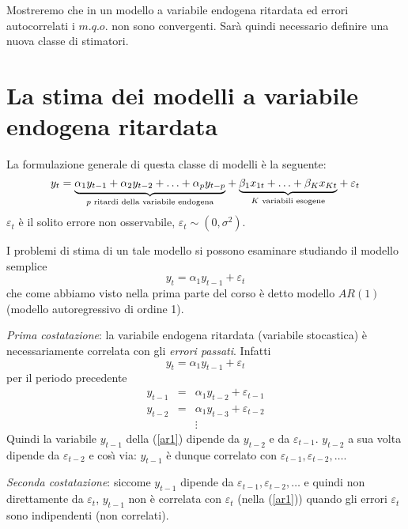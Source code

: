 \documentclass[a4paper]{report}
\newcounter{def}
\theoremstyle{remark}
\begin{document}
\noindent Mostreremo che in un modello a variabile endogena ritardata ed
errori autocorrelati i $m.q.o.$ non sono convergenti. Sar\`{a} quindi
necessario definire una nuova classe di stimatori.

\section{La stima dei modelli a variabile endogena ritardata}

La formulazione generale di questa classe di modelli \`{e} la seguente:%
\begin{equation*}
y_{t}=\underset{p\text{ ritardi della variabile endogena}}{\underbrace{%
\alpha _{1}y_{t-1}+\alpha _{2}y_{t-2}+\ldots +\alpha _{p}y_{t-p}}}+\underset{%
K\text{ variabili esogene}}{\underbrace{\beta _{1}x_{1t}+\ldots +\beta
_{K}x_{Kt}}}+\varepsilon _{t}
\end{equation*}%
$\varepsilon _{t}$ \`{e} il solito errore non osservabile, $\varepsilon
_{t}\sim (0,\sigma ^{2})$.

\noindent I problemi di stima di un tale modello si possono esaminare
studiando il modello semplice 
\begin{equation*}
y_{t}=\alpha _{1}y_{t-1}+\varepsilon _{t}
\end{equation*}%
che come abbiamo visto nella prima parte del corso \`{e} detto modello $%
AR(1) $ (modello autoregressivo di ordine 1).\vspace{0.5cm}

\noindent \emph{Prima costatazione}: la variabile endogena ritardata
(variabile stocastica) \`{e} necessariamente correlata con gli \emph{errori
passati}. Infatti%
\begin{equation}
y_{t}=\alpha _{1}y_{t-1}+\varepsilon _{t}  \label{ar1}
\end{equation}%
per il periodo precedente%
\begin{eqnarray*}
y_{t-1} &=&\alpha _{1}y_{t-2}+\varepsilon _{t-1} \\
y_{t-2} &=&\alpha _{1}y_{t-3}+\varepsilon _{t-2} \\
&&\vdots
\end{eqnarray*}%
Quindi la variabile $y_{t-1}$ della (\ref{ar1}) dipende da $y_{t-2}$ e da $%
\varepsilon _{t-1}$. $y_{t-2}$ a sua volta dipende da $\varepsilon _{t-2}$ e
cos\`{\i} via: $y_{t-1}$ \`{e} dunque correlato con $\varepsilon
_{t-1},\varepsilon _{t-2},\ldots $.\vspace{0.5cm}

\noindent \emph{Seconda costatazione}: siccome $y_{t-1}$ dipende da $%
\varepsilon _{t-1},\varepsilon _{t-2},\ldots $ e quindi non direttamente da $%
\varepsilon _{t}$, $y_{t-1}$ non \`{e} correlata con $\varepsilon _{t}$
(nella (\ref{ar1})) quando gli errori $\varepsilon _{t}$ sono indipendenti
(non correlati).
\end{document}
